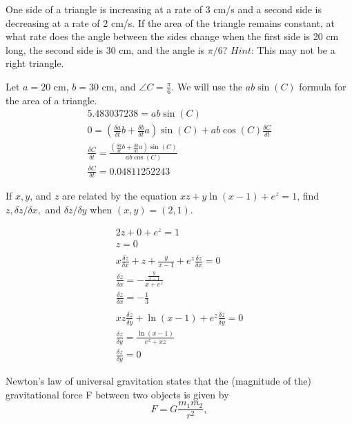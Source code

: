 \documentclass[12pt]{exam}
\begin{document}
\begin{questions}
\begin{parts}
\begin{solution}
		\end{solution}
	\end{parts}
\question One side of a triangle is increasing at a rate of 3 cm/s and a second side is decreasing at a rate of 2 cm/s. If the area of the triangle remains constant, at what rate does the angle between the sides change when the first side is 20 cm long, the second side is 30 cm, and the angle is $\pi/6$? $Hint$: This may not be a right triangle.
	\begin{solution}
		Let $a=20$ cm, $b = 30$ cm, and $\angle C=\frac{\pi}{6}$. We will use the $ab\sin(C)$ formula for the area of a triangle.
		\begin{gather*}
			5.483037238 = ab\sin(C) \\
			0 = (\frac{\delta a}{\delta t}b + \frac{\delta b}{\delta t}a)\sin(C)+ab\cos(C)\frac{\delta C}{\delta t}\\
			\frac{\delta C}{\delta t} = \frac{(\frac{\delta a}{\delta t}b + \frac{\delta b}{\delta t}a)\sin(C)}{ab\cos(C)} \\
			\boxed{\frac{\delta C}{\delta t} = 0.04811252243}
		\end{gather*}
	\end{solution}
\question If $x, y$, and $z$ are related by the equation $xz + y \ln(x - 1) + e^z = 1$, find $z, \delta z/\delta x,$ and $\delta z/\delta y$ when $(x, y) = (2, 1)$.
	\begin{solution}
		\begin{gather*}
			2z + 0 + e^z = 1\\
			\boxed{z=0} \\\\
			x\frac{\delta z}{\delta x} + z + \frac{y}{x - 1} + e^z\frac{\delta z}{\delta x} = 0 \\
			\frac{\delta z}{\delta x} = -\frac{\frac{y}{x - 1}}{x+e^z} \\
			\boxed{\frac{\delta z}{\delta x} = -\frac{1}{3}}\\\\
			xz\frac{\delta z}{\delta y} + \ln(x - 1) + e^z\frac{\delta z}{\delta y} = 0 \\
			\frac{\delta z}{\delta y} = \frac{\ln(x - 1)}{e^z + xz} \\
			\boxed{ \frac{\delta z}{\delta y} = 0} \tag*{\qed}
		\end{gather*}
	\end{solution}
\question Newton's law of universal gravitation states that the (magnitude of the) gravitational force F between two objects is given by
\[ F = G\frac{m_1m_2}{r^2}, \]

\end{questions}
\end{document}
